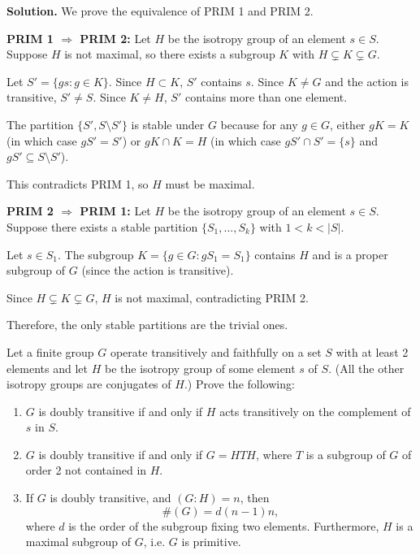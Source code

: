 \noindent\textbf{Solution.} We prove the equivalence of PRIM 1 and PRIM 2.

\textbf{PRIM 1 $\Rightarrow$ PRIM 2:} Let $H$ be the isotropy group of an element $s \in S$. Suppose $H$ is not maximal, so there exists a subgroup $K$ with $H \subsetneq K \subsetneq G$.

Let $S' = \{gs : g \in K\}$. Since $H \subset K$, $S'$ contains $s$. Since $K \neq G$ and the action is transitive, $S' \neq S$. Since $K \neq H$, $S'$ contains more than one element.

The partition $\{S', S \setminus S'\}$ is stable under $G$ because for any $g \in G$, either $gK = K$ (in which case $gS' = S'$) or $gK \cap K = H$ (in which case $gS' \cap S' = \{s\}$ and $gS' \subseteq S \setminus S'$).

This contradicts PRIM 1, so $H$ must be maximal.

\textbf{PRIM 2 $\Rightarrow$ PRIM 1:} Let $H$ be the isotropy group of an element $s \in S$. Suppose there exists a stable partition $\{S_1, \ldots, S_k\}$ with $1 < k < |S|$.

Let $s \in S_1$. The subgroup $K = \{g \in G : gS_1 = S_1\}$ contains $H$ and is a proper subgroup of $G$ (since the action is transitive).

Since $H \subsetneq K \subsetneq G$, $H$ is not maximal, contradicting PRIM 2.

Therefore, the only stable partitions are the trivial ones.

\begin{problembox}
Let a finite group $G$ operate transitively and faithfully on a set $S$ with at least 2 elements and let $H$ be the isotropy group of some element $s$ of $S$. (All the other isotropy groups are conjugates of $H$.) Prove the following:
\begin{enumerate}[label=(\alph*)]
\item $G$ is doubly transitive if and only if $H$ acts transitively on the complement of $s$ in $S$.
\item $G$ is doubly transitive if and only if $G = HTH$, where $T$ is a subgroup of $G$ of order 2 not contained in $H$.
\item If $G$ is doubly transitive, and $(G : H) = n$, then
\[\#(G) = d(n - 1)n,\]
where $d$ is the order of the subgroup fixing two elements. Furthermore, $H$ is a maximal subgroup of $G$, i.e. $G$ is primitive.
\end{enumerate}
\end{problembox}

